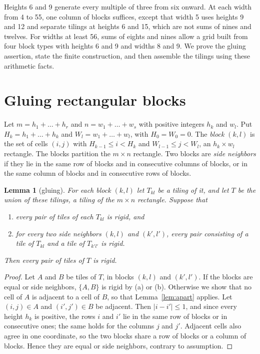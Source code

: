 \documentclass[11pt]{article}
\newtheorem{lemma}[theorem]{Lemma}
\theoremstyle{definition}
\theoremstyle{remark}
\begin{document}
Heights 6 and 9 generate every multiple of three from six onward. At each
width from 4 to 55, one column of blocks suffices, except that width 5 uses
heights 9 and 12 and separate tilings at heights 6 and 15, which are not
sums of nines and twelves. For widths at
least 56, sums of eights and nines allow a grid built from four block types with heights
6 and 9 and widths 8 and 9. We prove the gluing assertion, state the finite
construction, and then assemble the tilings using these arithmetic facts.

\section{Gluing rectangular blocks}\label{sec:glue}

Let $m=h_1+\dots+h_r$ and $n=w_1+\dots+w_s$ with positive integers $h_k$ and
$w_l$. Put $H_k=h_1+\dots+h_k$ and $W_l=w_1+\dots+w_l$, with $H_0=W_0=0$. The
\emph{block} $(k,l)$ is the set of cells $(i,j)$ with $H_{k-1}\le i<H_k$ and
$W_{l-1}\le j<W_l$, an $h_k\times w_l$ rectangle. The blocks partition the
$m\times n$ rectangle. Two blocks are \emph{side neighbors} if they lie in
the same row of blocks and in consecutive columns of blocks, or in the same
column of blocks and in consecutive rows of blocks.

\begin{lemma}[gluing]\label{lem:glue}
For each block $(k,l)$ let $T_{kl}$ be a tiling of it, and let $T$ be the
union of these tilings, a tiling of the $m\times n$ rectangle. Suppose that
\begin{enumerate}
\item[(a)] every pair of tiles of each $T_{kl}$ is rigid, and
\item[(b)] for every two side neighbors $(k,l)$ and $(k',l')$, every pair
consisting of a tile of $T_{kl}$ and a tile of $T_{k'l'}$ is rigid.
\end{enumerate}
Then every pair of tiles of $T$ is rigid.
\end{lemma}

\begin{proof}
Let $A$ and $B$ be tiles of $T$, in blocks $(k,l)$ and $(k',l')$. If the
blocks are equal or side neighbors, $\{A,B\}$ is rigid by (a) or (b).
Otherwise we show that no cell of $A$ is adjacent to a cell of $B$, so that
Lemma~\ref{lem:apart} applies. Let $(i,j)\in A$ and $(i',j')\in B$ be
adjacent. Then $|i-i'|\le1$, and since every height $h_k$ is positive, the
rows $i$ and $i'$ lie in the same row of blocks or in consecutive ones; the
same holds for the columns $j$ and $j'$. Adjacent cells also agree in one
coordinate, so the two blocks share a row of blocks or a column of blocks.
Hence they are equal or side neighbors, contrary to assumption.
\end{proof}
\end{document}
